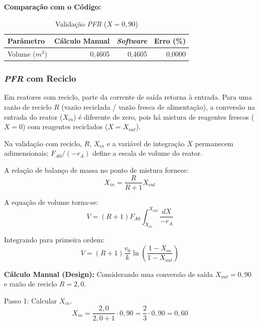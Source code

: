 \textbf{Comparação com o Código:}
\begin{table}[H]
    \centering
    \caption{Validação \textit{PFR} ($X=0,90$)}
    \begin{tabular}{lrrr}
        \toprule
        \textbf{Parâmetro} & \textbf{Cálculo Manual} & \textbf{\textit{Software}} & \textbf{Erro (\%)} \\
        \midrule
        Volume ($m^3$) & 0,4605 & 0,4605 & 0,0000 \\
        \bottomrule
    \end{tabular}
\end{table}

\subsubsection{\textit{PFR} com Reciclo}

Em reatores com reciclo, parte da corrente de saída retorna à entrada. Para uma razão de reciclo $R$ (vazão reciclada / vazão fresca de alimentação), a conversão na entrada do reator ($X_{in}$) é diferente de zero, pois há mistura de reagentes frescos ($X=0$) com reagentes reciclados ($X=X_{out}$).

Na validação com reciclo, $R$, $X_{in}$ e a variável de integração $X$ permanecem adimensionais; $F_{A0}/(-r_A)$ define a escala de volume do reator.

A relação de balanço de massa no ponto de mistura fornece:
\begin{equation}
    X_{in} = \frac{R}{R+1} X_{out}
    \label{eq:val_recycle_xin}
\end{equation}

A equação de volume torna-se:
\begin{equation}
    V = (R+1) F_{A0} \int_{X_{in}}^{X_{out}} \frac{dX}{-r_A}
    \label{eq:val_recycle_vol_eq}
\end{equation}

Integrando para primeira ordem:
\begin{equation}
    V = (R+1) \frac{v_0}{k} \ln\left( \frac{1-X_{in}}{1-X_{out}} \right)
    \label{eq:val_recycle_vol_int}
\end{equation}

\textbf{Cálculo Manual (Design):}
Considerando uma conversão de saída $X_{out} = 0,90$ e razão de reciclo $R = 2,0$.

Passo 1: Calcular $X_{in}$.
\begin{equation}
    X_{in} = \frac{2,0}{2,0 + 1} \cdot 0,90 = \frac{2}{3} \cdot 0,90 = 0,60
    \label{eq:val_recycle_xin_calc}
\end{equation}

